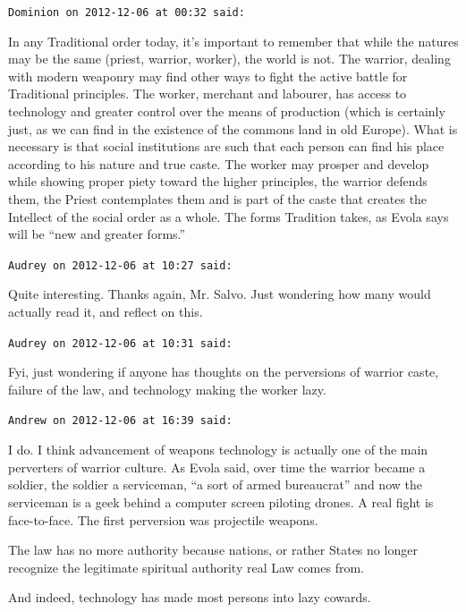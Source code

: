 \begin{footnotesize}
\begin{sffamily}
\texttt{Dominion on 2012-12-06 at 00:32 said:}

In any Traditional order today, it's important to remember that while the natures may be the same (priest, warrior, worker), the world is not. The warrior, dealing with modern weaponry may find other ways to fight the active battle for Traditional principles. The worker, merchant and labourer, has access to technology and greater control over the means of production (which is certainly just, as we can find in the existence of the commons land in old Europe). What is necessary is that social institutions are such that each person can find his place according to his nature and true caste. The worker may prosper and develop while showing proper piety toward the higher principles, the warrior defends them, the Priest contemplates them and is part of the caste that creates the Intellect of the social order as a whole. The forms Tradition takes, as Evola says will be ``new and greater forms.''

\hfill

\texttt{Audrey on 2012-12-06 at 10:27 said:}

Quite interesting. Thanks again, Mr. Salvo. Just wondering how many would actually read it, and reflect on this.

\hfill

\texttt{Audrey on 2012-12-06 at 10:31 said:}

Fyi, just wondering if anyone has thoughts on the perversions of warrior caste, failure of the law, and technology making the worker lazy.

\hfill

\texttt{Andrew on 2012-12-06 at 16:39 said:}

I do. I think advancement of weapons technology is actually one of the main perverters of warrior culture. As Evola said, over time the warrior became a soldier, the soldier a serviceman, ``a sort of armed bureaucrat'' and now the serviceman is a geek behind a computer screen piloting drones. A real fight is face-to-face. The first perversion was projectile weapons.

The law has no more authority because nations, or rather States no longer recognize the legitimate spiritual authority real Law comes from.

And indeed, technology has made most persons into lazy cowards.

\hfill


\end{sffamily}
\end{footnotesize}
